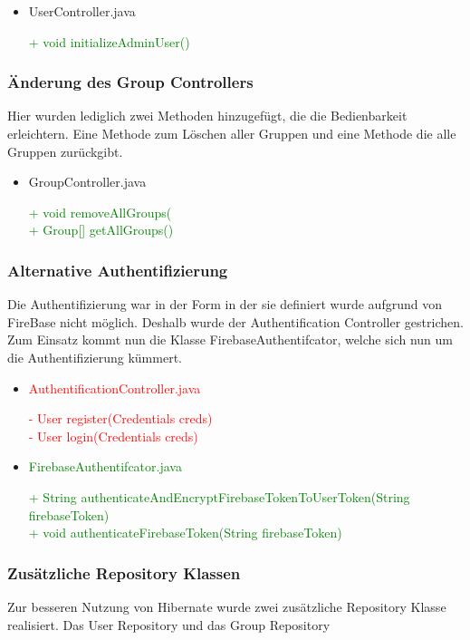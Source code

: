 \documentclass[a4paper]{scrreprt}
\begin{document}
\begin{itemize}
\item{UserController.java}

\textcolor{green}{+ void initializeAdminUser()}\\
\end{itemize}

\subsubsection{Änderung des Group Controllers}
Hier wurden lediglich zwei Methoden hinzugefügt, die die Bedienbarkeit erleichtern. Eine Methode zum Löschen aller Gruppen und eine Methode die alle Gruppen zurückgibt.

\begin{itemize}
\item{GroupController.java}

\textcolor{green}{+ void removeAllGroups(}\\
\textcolor{green}{+ Group[] getAllGroups()}\\
\end{itemize}

\subsubsection{Alternative Authentifizierung}
Die Authentifizierung war in der Form in der sie definiert wurde aufgrund von FireBase nicht möglich. Deshalb wurde der Authentification Controller gestrichen. Zum Einsatz kommt nun die Klasse FirebaseAuthentifcator, welche sich nun um die Authentifizierung kümmert.

\begin{itemize}
\item\textcolor{red}{AuthentificationController.java}

\textcolor{red}{- User register(Credentials creds)}\\
\textcolor{red}{- User login(Credentials creds)}\\

\item\textcolor{green}{FirebaseAuthentifcator.java}

\textcolor{green}{+ String authenticateAndEncryptFirebaseTokenToUserToken(String firebaseToken)}\\
\textcolor{green}{+ void authenticateFirebaseToken(String firebaseToken)}
\end{itemize}

\subsubsection{Zusätzliche Repository Klassen}
Zur besseren Nutzung von Hibernate wurde zwei zusätzliche Repository Klasse realisiert. Das User Repository und das Group Repository
\end{document}
